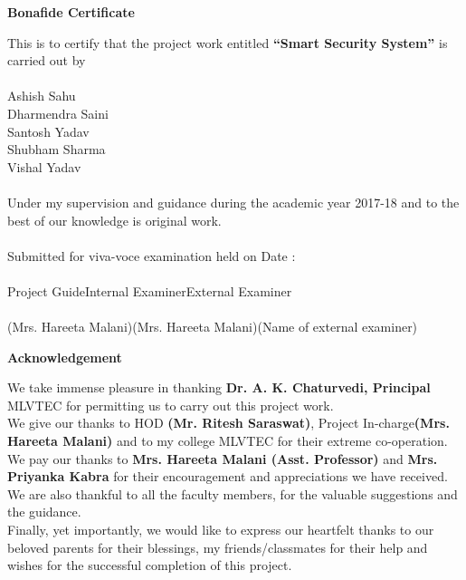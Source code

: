 \documentclass[twoside,a4paper,16pt]{book}
\begin{document}
{\begin{center}
	\huge{\bf Bonafide Certificate} 
\end{center}
\vspace{2cm}
{\large This is to certify that the project work entitled {\bf “Smart Security System”} is carried out by\\
\vspace{.5cm}\\
Ashish Sahu \\
Dharmendra Saini\\
Santosh Yadav\\
Shubham Sharma\\
Vishal Yadav\\
\\
Under my supervision and guidance during the academic year 2017-18 and to the best of our knowledge is original work.\\
\\
Submitted for viva-voce examination held on Date :\\
\vspace{2cm}\\
Project Guide\hspace{3.5cm}Internal Examiner\hspace{3.5cm}External Examiner\\
\vspace{1cm}\\
(Mrs. Hareeta Malani)\hspace{1.8cm}(Mrs. Hareeta Malani)\hspace{2.8cm}(Name of external examiner)
\newpage
\begin{center}
	\huge{\bf Acknowledgement} 
\end{center}
\vspace{1.5cm}
 
{\large We take immense pleasure in thanking {\bf Dr. A. K. Chaturvedi, Principal} MLVTEC for permitting us to carry out this project work.\\
We give our thanks to HOD {\bf (Mr. Ritesh Saraswat)}, Project In-charge{\bf (Mrs. Hareeta Malani)} and to my college MLVTEC for their extreme co-operation.\\
We pay our thanks to {\bf Mrs. Hareeta Malani (Asst. Professor)} and {\bf Mrs. Priyanka Kabra} for their encouragement and appreciations we have received.\\
We are also thankful to all the faculty members, for the valuable suggestions and the guidance.\\
Finally, yet importantly, we would like to express our heartfelt thanks to our beloved parents for their blessings, my friends/classmates for their help and wishes for the successful completion of this project.\\


}}}
\end{document}
